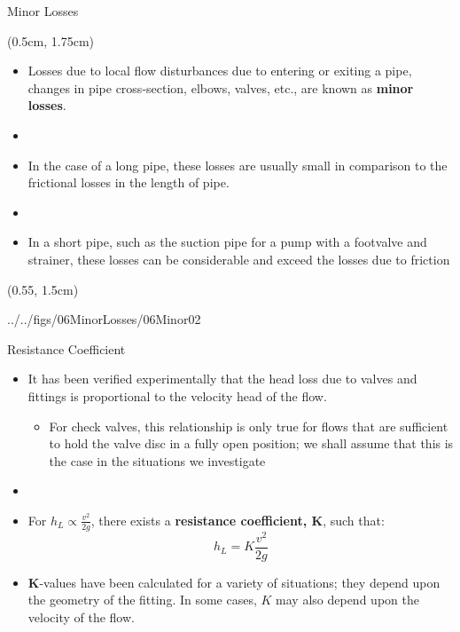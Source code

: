 \documentclass[9pt,xcolor={svgnames, x11names},professionalfonts, mathserif]{beamer}
\begin{document}
\begin{frame}{Minor Losses}

 \begin{textblock*}{0.5\columnwidth}(0.5cm, 1.75cm)

  \begin{itemize}

   \item Losses due to local flow disturbances due to entering or exiting a pipe, changes in pipe cross-section,
         elbows, valves, etc., are known as \textbf{minor losses}.
   \item[]
   \item In the case of a long pipe, these losses are usually small in comparison to the frictional losses in the
         length of pipe.
   \item[]
   \item In a short pipe, such as the suction pipe for a pump with a footvalve and strainer, these losses can be
         considerable and exceed the losses due to friction

  \end{itemize}

 \end{textblock*}

 \begin{textblock*}{0.5\columnwidth}(0.55\columnwidth, 1.5cm)
  \begin{cfig}[0.25]{../../figs/06MinorLosses/06Minor02}\end{cfig}
 \end{textblock*}

\end{frame}


\begin{frame}{Resistance Coefficient}

 \begin{itemize}

  \item It has been verified experimentally that the head loss due to valves and fittings is
        proportional to the velocity head of the flow.
        \begin{itemize}
         \item For check valves, this relationship is only true for flows that are sufficient to hold the valve disc in a
               fully open position; we shall assume that this is the case in the situations we investigate
        \end{itemize}
  \item[]
  \item For $h_L\propto\tfrac{v^2}{2g}$, there exists a \textbf{resistance coefficient, $\bm K$}, such that:
        \[ h_L = K\frac{v^2}{2g} \]
  \item $\bm K$-values have been calculated for a variety of situations; they depend upon the geometry of the
        fitting. In some cases, $K$ may also depend upon the velocity of the flow.

 \end{itemize}

\end{frame}
\end{document}
